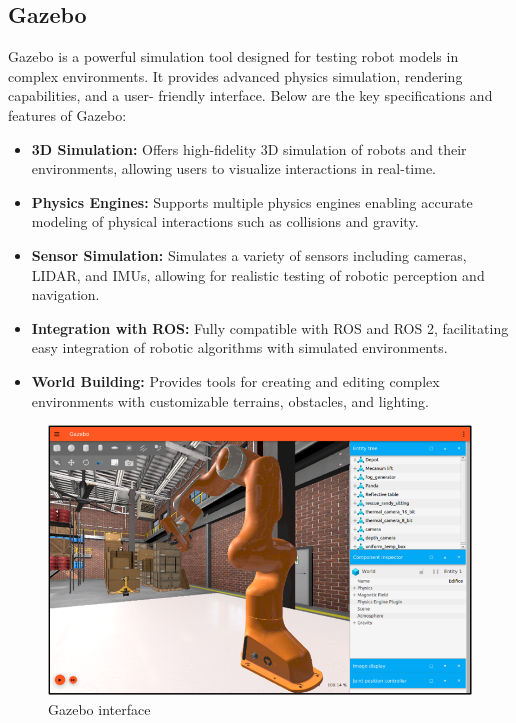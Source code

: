 \subsection{\fontsize{14}{16} Gazebo}
{
	\fontsize{12}{14}
	Gazebo is a powerful simulation tool designed for testing robot models in complex environments. It provides advanced physics simulation, rendering capabilities, and a user- friendly interface. Below are the key specifications and features of Gazebo:
	\begin{itemize}
		\item \textbf{3D Simulation:} Offers high-fidelity 3D simulation of robots and their environments,
		allowing users to visualize interactions in real-time.
		\item \textbf{Physics Engines:} Supports multiple physics engines enabling accurate modeling of
		physical interactions such as collisions and gravity.
		\item \textbf{Sensor Simulation:} Simulates a variety of sensors including cameras, LIDAR, and
		IMUs, allowing for realistic testing of robotic perception and navigation.
		\item \textbf{Integration with ROS:} Fully compatible with ROS and ROS 2, facilitating easy
		integration of robotic algorithms with simulated environments.
		\item \textbf{World Building:} Provides tools for creating and editing complex environments with
		customizable terrains, obstacles, and lighting.
	\end{itemize}
	
	\begin{figure}[H]
		\centering
		\includegraphics{images/Content/gazebo}
		\caption{Gazebo interface \cite{gazebo_github}}
		\label{fig:gazebo}
	\end{figure}
}

